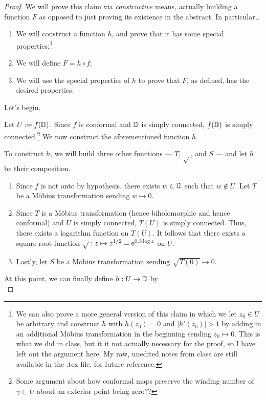 \documentclass[../notes.tex]{subfiles}
\begin{document}
\begin{itemize}
\begin{proof}
        We will prove this claim via \emph{constructive} means, actually building a function $F$ as opposed to just proving its existence in the abstract. In particular\dots
        \begin{enumerate}
            \item We will construct a function $h$, and prove that it has some special properties;\footnote{We can also prove a more general version of this claim in which we let $z_0\in U$ be arbitrary and construct $h$ with $h(z_0)=0$ and $|h'(z_0)|>1$ by adding in an additional M\"{o}bius transformation in the beginning sending $z_0\mapsto 0$. This is what we did in class, but it it not actually necessary for the proof, so I have left out the argument here. My raw, unedited notes from class are still available in the .tex file, for future reference.}
            \item We will define $F=h\circ f$;
            \item We will use the special properties of $h$ to prove that $F$, as defined, has the desired properties.
        \end{enumerate}
        Let's begin.\par
        Let $U:=f(\D)$. Since $f$ is conformal and $\D$ is simply connected, $f(\D)$ is simply connected.\footnote{Some argument about how conformal maps preserve the winding number of $\gamma\subset U$ about an exterior point being zero??} We now construct the aforementioned function $h$.\par
        To construct $h$, we will build three other functions --- $T$, $\sqrt{}$, and $S$ --- and let $h$ be their composition.
        \begin{enumerate}
            \item Since $f$ is not onto by hypothesis, there exists $w\in\D$ such that $w\notin U$. Let $T$ be a M\"{o}bius transformation sending $w\mapsto 0$.
            \item Since $T$ is a M\"{o}bius transformation (hence biholomorphic and hence conformal) and $U$ is simply connected, $T(U)$ is simply connected. Thus, there exists a logarithm function on $T(U)$. It follows that there exists a square root function $\sqrt{}:z\mapsto z^{1/2}=\e[0.5\log z]$ on $U$.
            \item Lastly, let $S$ be a M\"{o}bius transformation sending $\sqrt{T(0)}\mapsto 0$.
        \end{enumerate}
        At this point, we can finally define $h:U\to\D$ by
        \begin{equation*}

\end{equation*}
\end{proof}
\end{itemize}
\end{document}
